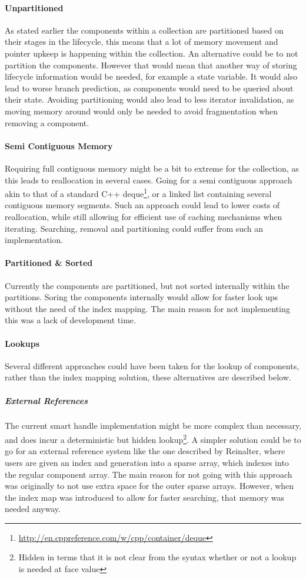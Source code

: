 \paragraph{Unpartitioned}
As stated earlier the components within a collection are partitioned based on their stages in the lifecycle,
this means that a lot of memory movement and pointer upkeep is happening within the collection.
An alternative could be to not partition the components. However that would mean that another way of storing
lifecycle information would be needed, for example a state variable.
It would also lead to worse branch prediction, as components would need to be queried about their state.
Avoiding partitioning would also lead to less iterator invalidation, as moving memory around would
only be needed to avoid fragmentation when removing a component.

\paragraph{Semi Contiguous Memory}
Requiring full contiguous memory might be a bit to extreme for the collection, as this leads to
reallocation in several cases. Going for a semi contiguous approach akin to that of a standard C++ deque\footnote{\url{http://en.cppreference.com/w/cpp/container/deque}},
or a linked list containing several contiguous memory segments.
Such an approach could lead to lower costs of reallocation, while still allowing for efficient use of caching mechanisms
when iterating.
Searching, removal and partitioning could suffer from such an implementation.

\paragraph{Partitioned \& Sorted}
Currently the components are partitioned, but not sorted internally within the partitions.
Soring the components internally would allow for faster look ups without the need of the index mapping.
The main reason for not implementing this was a lack of development time.

\paragraph{Lookups}
Several different approaches could have been taken for the lookup of components, rather than the index mapping solution,
these alternatives are described below.

\subparagraph{External References}
The current smart handle implementation might be more complex than necessary, and does incur a deterministic but hidden lookup\footnote{Hidden in terms that it is not clear from the syntax whether or not a lookup is needed at face value}.
A simpler solution could be to go for an external reference system like the one described by Reinalter\cite{molecular_matters_dod_external_references},
where users are given an index and generation into a sparse array, which indexes into the regular component array.
The main reason for not going with this approach was originally to not use extra space for the outer sparse arrays.
However, when the index map was introduced to allow for faster searching, that memory was needed anyway.

